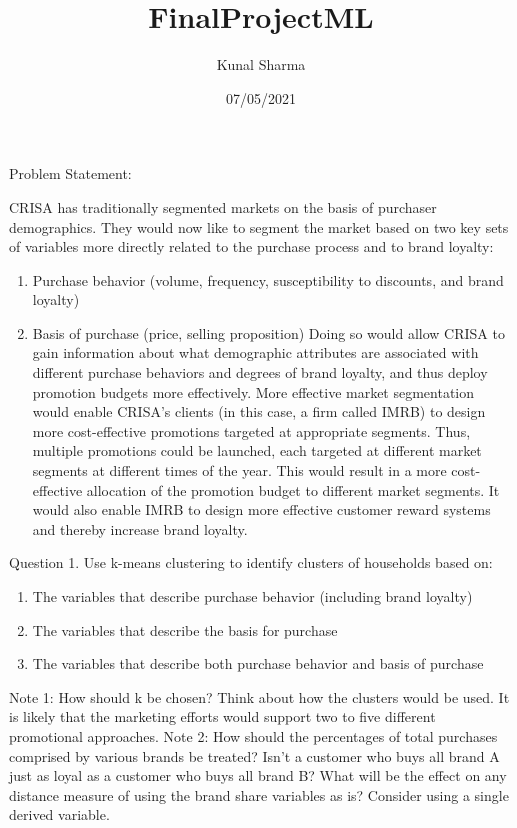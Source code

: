 \documentclass[
]{article}
\title{FinalProjectML}
\author{Kunal Sharma}
\date{07/05/2021}
\providecommand{\tightlist}{%
  \setlength{\itemsep}{0pt}\setlength{\parskip}{0pt}}
\begin{document}
\maketitle

Problem Statement:

CRISA has traditionally segmented markets on the basis of purchaser
demographics. They would now like to segment the market based on two key
sets of variables more directly related to the purchase process and to
brand loyalty:

\begin{enumerate}
\def\labelenumi{\arabic{enumi}.}
\tightlist
\item
  Purchase behavior (volume, frequency, susceptibility to discounts, and
  brand loyalty)
\item
  Basis of purchase (price, selling proposition) Doing so would allow
  CRISA to gain information about what demographic attributes are
  associated with different purchase behaviors and degrees of brand
  loyalty, and thus deploy promotion budgets more effectively. More
  effective market segmentation would enable CRISA's clients (in this
  case, a firm called IMRB) to design more cost-effective promotions
  targeted at appropriate segments. Thus, multiple promotions could be
  launched, each targeted at different market segments at different
  times of the year. This would result in a more cost-effective
  allocation of the promotion budget to different market segments. It
  would also enable IMRB to design more effective customer reward
  systems and thereby increase brand loyalty.
\end{enumerate}

Question 1. Use k-means clustering to identify clusters of households
based on:

\begin{enumerate}
\def\labelenumi{\alph{enumi}.}
\item
  The variables that describe purchase behavior (including brand
  loyalty)
\item
  The variables that describe the basis for purchase
\item
  The variables that describe both purchase behavior and basis of
  purchase
\end{enumerate}

Note 1: How should k be chosen? Think about how the clusters would be
used. It is likely that the marketing efforts would support two to five
different promotional approaches. Note 2: How should the percentages of
total purchases comprised by various brands be treated? Isn't a customer
who buys all brand A just as loyal as a customer who buys all brand B?
What will be the effect on any distance measure of using the brand share
variables as is? Consider using a single derived variable.
\end{document}
